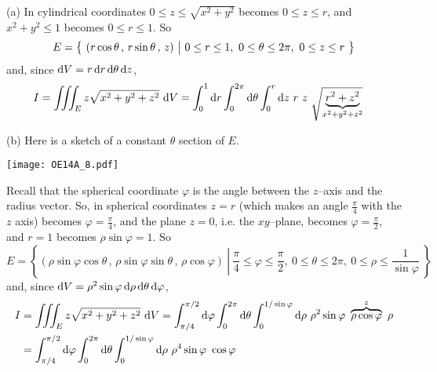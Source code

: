 \begin{solution}
(a) In cylindrical coordinates $0\le z\le \sqrt{x^2+y^2}$ becomes
$0\le z\le r$, and $x^2+y^2\le 1$ becomes $0\le r\le 1$. So
\begin{equation*}
E = \big\{ \ (r\cos\theta\,,\,r\sin\theta\,,\,z)\ \big|\ 0\le r\le 1,\ 0\le\theta\le 2\pi,
              \ 0\le z\le r\ \big\}
\end{equation*}
and, since $\mathrm{d}V = r\,\mathrm{d}r\,\mathrm{d}\theta\,\mathrm{d}z$,
\begin{align*}
I &= \tripInt_E z \sqrt{x^2 + y^2 + z^2}\  \dee{V} 
  = \int_0^1\dee{r} \int_0^{2\pi}\dee{\theta} \int_0^r\dee{z}\ 
           r\ z\ \sqrt{\underbrace{r^2+z^2}_{x^2+y^2+z^2}}
\end{align*} 

(b)
Here is a sketch of a constant $\theta$ section of $E$.

\begin{center}
     \texttt{[image: OE14A\_8.pdf]}
\end{center}

Recall that the spherical coordinate $\varphi$ is the angle
between the $z$--axis and the radius vector. 
So, in spherical coordinates $z=r$ (which makes an angle $\frac{\pi}{4}$
with the $z$ axis) becomes $\varphi=\frac{\pi}{4}$, and
the plane $z=0$, i.e. the $xy$--plane, becomes $\varphi=\frac{\pi}{2}$,
and $r=1$ becomes $\rho\sin\varphi = 1$.  So
\begin{equation*}
E = \left\{(\rho\sin\varphi\cos\theta\,,\,\rho\sin\varphi\sin\theta\,,\,
          \rho\cos\varphi)\ \left|\ 
                    \frac{\pi}{4}\le \varphi\le \frac{\pi}{2},
            \ 0\le\theta\le 2\pi,
              \ 0\le \rho\le \frac{1}{\sin\varphi}\ \right.\right\}
\end{equation*}
and, since 
  $\mathrm{d}V = \rho^2\sin\varphi\,\mathrm{d}\rho\,\mathrm{d}\theta\,\mathrm{d}\varphi$,
\begin{align*}
I &= \tripInt_E z \sqrt{x^2 + y^2 + z^2}\  \dee{V}
  = \int_{\pi/4}^{\pi/2}\dee{\varphi} 
                \int_0^{2\pi}\dee{\theta} 
                \int_0^{1/\sin\varphi}\dee{\rho}\ 
                \rho^2\sin\varphi \ 
           \overbrace{\rho\cos\varphi}^{z}\ \rho \\
  &= \int_{\pi/4}^{\pi/2}\dee{\varphi} 
                \int_0^{2\pi}\dee{\theta} 
                \int_0^{1/\sin\varphi}\dee{\rho}\ 
                \rho^4\sin\varphi \ \cos\varphi
\end{align*} 


\end{solution}
